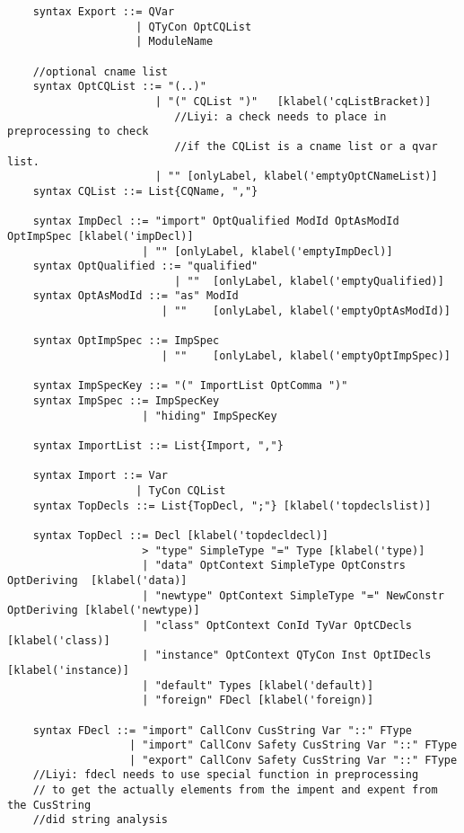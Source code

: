 \begin{lstlisting}
    syntax Export ::= QVar 
                    | QTyCon OptCQList
                    | ModuleName

    //optional cname list
    syntax OptCQList ::= "(..)"
                       | "(" CQList ")"   [klabel('cqListBracket)]
                          //Liyi: a check needs to place in preprocessing to check
                          //if the CQList is a cname list or a qvar list.
                       | "" [onlyLabel, klabel('emptyOptCNameList)]
    syntax CQList ::= List{CQName, ","}

    syntax ImpDecl ::= "import" OptQualified ModId OptAsModId OptImpSpec [klabel('impDecl)]
                     | "" [onlyLabel, klabel('emptyImpDecl)]
    syntax OptQualified ::= "qualified"
                          | ""  [onlyLabel, klabel('emptyQualified)]
    syntax OptAsModId ::= "as" ModId
                        | ""    [onlyLabel, klabel('emptyOptAsModId)]

    syntax OptImpSpec ::= ImpSpec
                        | ""    [onlyLabel, klabel('emptyOptImpSpec)]

    syntax ImpSpecKey ::= "(" ImportList OptComma ")"
    syntax ImpSpec ::= ImpSpecKey
                     | "hiding" ImpSpecKey

    syntax ImportList ::= List{Import, ","}

    syntax Import ::= Var
                    | TyCon CQList
    syntax TopDecls ::= List{TopDecl, ";"} [klabel('topdeclslist)]

    syntax TopDecl ::= Decl [klabel('topdecldecl)]
                     > "type" SimpleType "=" Type [klabel('type)]
                     | "data" OptContext SimpleType OptConstrs OptDeriving  [klabel('data)]
                     | "newtype" OptContext SimpleType "=" NewConstr OptDeriving [klabel('newtype)]
                     | "class" OptContext ConId TyVar OptCDecls [klabel('class)]
                     | "instance" OptContext QTyCon Inst OptIDecls [klabel('instance)]
                     | "default" Types [klabel('default)]
                     | "foreign" FDecl [klabel('foreign)]

    syntax FDecl ::= "import" CallConv CusString Var "::" FType
                   | "import" CallConv Safety CusString Var "::" FType
                   | "export" CallConv Safety CusString Var "::" FType
    //Liyi: fdecl needs to use special function in preprocessing
    // to get the actually elements from the impent and expent from the CusString
    //did string analysis
    

\end{lstlisting}
